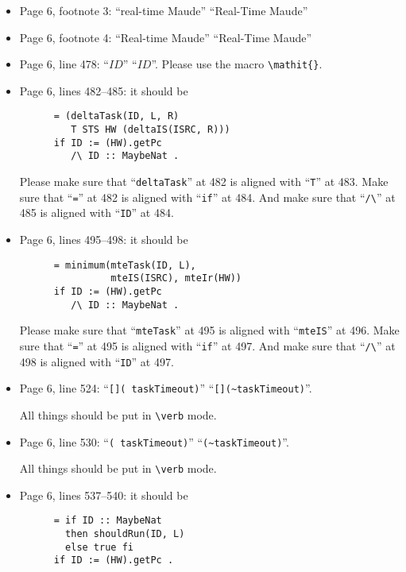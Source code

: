 \documentclass[12pt,onecolumn]{IEEEtranTIE}
\begin{document}
\begin{itemize}
\item Page 6, footnote 3: ``real-time Maude'' \by ``Real-Time Maude''

\item Page 6, footnote 4: ``Real-time Maude'' \by ``Real-Time Maude''  

\item Page 6, line 478: ``$ID$'' \by ``$\mathit{ID}$''. Please use the
  macro \verb|\mathit{}|.


\item Page 6, lines 482--485: it should be
\begin{verbatim}
      = (deltaTask(ID, L, R) 
         T STS HW (deltaIS(ISRC, R)))
      if ID := (HW).getPc 
         /\ ID :: MaybeNat .
\end{verbatim}

Please make sure that ``\verb|deltaTask|'' at 482 is aligned with
``\verb|T|'' at 483. Make sure that ``\verb|=|'' at 482 is aligned
with ``\verb|if|'' at 484. And make sure that ``\verb|/\|'' at 485 is
aligned with ``\verb|ID|'' at 484.


\item Page 6, lines 495--498: it should be
\begin{verbatim}
      = minimum(mteTask(ID, L),
                mteIS(ISRC), mteIr(HW))
      if ID := (HW).getPc 
         /\ ID :: MaybeNat .
\end{verbatim}

Please make sure that ``\verb|mteTask|'' at 495 is aligned with
``\verb|mteIS|'' at 496. Make sure that ``\verb|=|'' at 495 is aligned
with ``\verb|if|'' at 497. And make sure that ``\verb|/\|'' at 498 is
aligned with ``\verb|ID|'' at 497.

\item Page 6, line 524: ``\verb|[]( taskTimeout)|'' \by
  ``\verb|[](~taskTimeout)|''.

All things should be put in \verb|\verb| mode.

\item Page 6, line 530: ``\verb|( taskTimeout)|'' \by
  ``\verb|(~taskTimeout)|''.

All things should be put in \verb|\verb| mode.  


\item Page 6, lines 537--540: it should be
\begin{verbatim}
      = if ID :: MaybeNat 
        then shouldRun(ID, L)
        else true fi
      if ID := (HW).getPc .
\end{verbatim}


\end{itemize}
\end{document}
